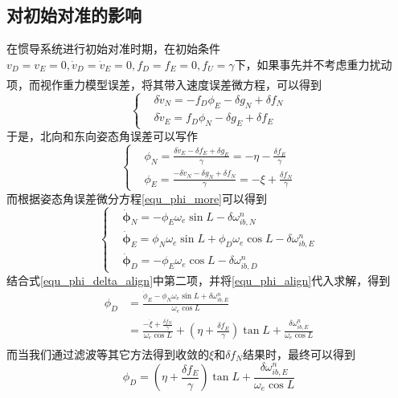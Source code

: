 \documentclass[12pt,a4,utf8]{article}
\newcommand{\upcite}[1]{\textsuperscript{\textsuperscript{\cite{#1}}}} %
\begin{document}
\subsection{对初始对准的影响}
在惯导系统进行初始对准时期，在初始条件$v_D =v_E=0, \dot{v}_D=\dot{v}_E = 0, f_D = f_E = 0, f_U = \gamma$下，如果事先并不考虑重力扰动项\upcite{LUOKAIXIN2023}，而视作重力模型误差，将其带入速度误差微方程，可以得到
\begin{equation}
      \left\{ \begin{aligned}
            &\delta \dot{v}_N = -f_D\phi_E - \delta g_N + \delta f_N
            \\
            &\delta \dot{v}_E = f_D\phi_N - \delta g_E + \delta f_E
      \end{aligned} \right.
\end{equation}
于是，北向和东向姿态角误差可以写作
\begin{equation}
      \left\{ \begin{aligned}
            &\phi_N = \frac{\delta \dot{v}_E - \delta f_E + \delta g_E}{\gamma} =  -\eta - \frac{\delta f_E}{\gamma}
            \\
            &\phi_E = \frac{-\delta \dot{v}_N - \delta g_N + \delta f_N}{\gamma} = -\xi + \frac{\delta f_N}{\gamma}
      \end{aligned} \right.
      \label{equ_phi_align}
\end{equation}
而根据姿态角误差微分方程\ref{equ_phi_more}可以得到
\begin{equation}
      \left\{ \begin{aligned}
      & \dot{\bm{\phi}}_N=-\phi_E \omega_e\sin L - \delta \omega^n_{ib,N} 
      \\ 
      & \dot{\bm{\phi}}_E= \phi_N \omega_e \sin L + \phi_D \omega_e \cos L - \delta \omega^n_{ib,E}
      \\ 
      & \dot{\bm{\phi}}_D = -\phi_E \omega_e \cos L - \delta \omega^n_{ib,D}
\end{aligned} \right.
\label{equ_phi_delta_align}
\end{equation}
结合式\ref{equ_phi_delta_align}中第二项，并将\ref{equ_phi_align}代入求解，得到
\begin{equation}
      \begin{aligned}
      \phi_D &= \frac{\dot{\phi}_E - \phi_N \omega_e \sin L +\delta \omega^n_{ib,E}}{\omega_e\cos L}
      \\
      &= \frac{-\dot{\xi} + \frac{\delta \dot{f}_N}{\gamma}}{\omega_e\cos L} + (\eta + \frac{\delta f_E}{\gamma})\tan L + \frac{\delta \omega^n_{ib,E}}{\omega_e\cos L}
      \end{aligned}
\end{equation}
而当我们通过滤波等其它方法得到收敛的$\xi$和$ \delta f_N$结果时\upcite{soler2014deflection}，最终可以得到
\begin{equation}
      \phi_D = (\eta + \frac{\delta f_E}{\gamma})\tan{L} + \frac{\delta \omega^n_{ib,E}}{\omega_e\cos L}
\end{equation}
\end{document}
